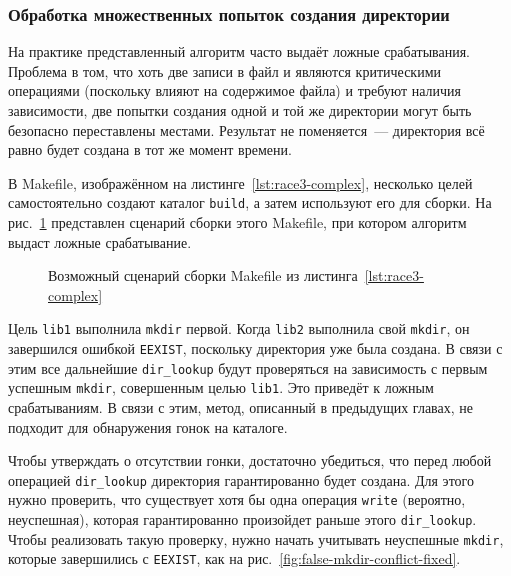\subsubsection{Обработка множественных попыток создания директории}

На практике представленный алгоритм часто выдаёт ложные срабатывания. Проблема в том, что хоть две записи в файл и являются критическими операциями (поскольку влияют на содержимое файла) и требуют наличия зависимости, две попытки создания одной и той же директории могут быть безопасно переставлены местами. Результат не поменяется~--- директория всё равно будет создана в тот же момент времени.



В Makefile, изображённом на листинге~\ref{lst:race3-complex}, несколько целей самостоятельно создают каталог \texttt{build}, а затем используют его для сборки. На рис.~\ref{fig:false-mkdir-conflict} представлен сценарий сборки этого Makefile, при котором алгоритм выдаст ложные срабатывание.

\begin{figure}[H]
    \centering
    
    \caption{Возможный сценарий сборки Makefile из листинга~\ref{lst:race3-complex}}
    \label{fig:false-mkdir-conflict}
\end{figure}

Цель \texttt{lib1} выполнила \texttt{mkdir} первой. Когда \texttt{lib2} выполнила свой \texttt{mkdir}, он завершился ошибкой \texttt{EEXIST}, поскольку директория уже была создана. В связи с этим все дальнейшие \texttt{dir\_lookup} будут проверяться на зависимость с первым успешным \texttt{mkdir}, совершенным целью \texttt{lib1}. Это приведёт к ложным срабатываниям. В связи с этим, метод, описанный в предыдущих главах, не подходит для обнаружения гонок на каталоге.

Чтобы утверждать о отсутствии гонки, достаточно убедиться, что перед любой операцией \texttt{dir\_lookup} директория гарантированно будет создана. Для этого нужно проверить, что существует хотя бы одна операция \texttt{write} (вероятно, неуспешная), которая гарантированно произойдет раньше этого \texttt{dir\_lookup}. Чтобы реализовать такую проверку, нужно начать учитывать неуспешные \texttt{mkdir}, которые завершились с \texttt{EEXIST}, как на рис.~\ref{fig:false-mkdir-conflict-fixed}.

